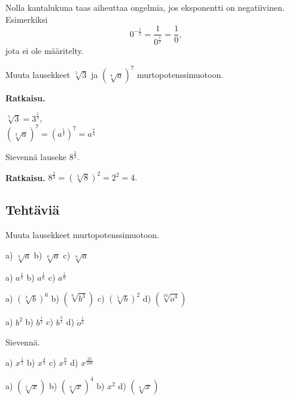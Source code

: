 Nolla kantalukuna taas aiheuttaa ongelmia, jos eksponentti on negatiivinen. Esimerkiksi
\[
 0^{-\tfrac{1}{2}}=\frac{1}{0^\frac{1}{2}}=\frac{1}{0}, %
\]
jota ei ole määritelty.

\begin{esimerkki}
Muuta lausekkeet $\sqrt[5]{3}$ ja $(\sqrt[4]{a})^7$ murtopotenssimuotoon.

{\bf Ratkaisu.}

$\sqrt[5]{3} = 3^\frac{1}{5}$, \\
$(\sqrt[4]{a})^7 = (a^\frac{1}{4})^7=a^\frac{7}{4}$
\end{esimerkki}

\begin{esimerkki}
Sievennä lauseke $8^\frac{2}{3}$.

{\bf Ratkaisu.}
 $8^\frac{2}{3} = (\sqrt[3]{8})^2 = 2^2 = 4.$
\end{esimerkki}

\subsection*{Tehtäviä}

Muuta lausekkeet murtopotenssimuotoon.

\begin{tehtava}
a) $\sqrt[3]{a}$ \qquad
b) $\sqrt[6]{a}$ \qquad
c) $\sqrt[n]{a}$ 
\begin{vastaus}	
a) $a^\frac{1}{3}$ \qquad
b) $a^\frac{1}{6}$ \qquad
c) $a^\frac{1}{n}$ \qquad
\end{vastaus}
\end{tehtava}

\begin{tehtava}
a) $(\sqrt[3]{b})^6$ \qquad
b) $(\sqrt[6]{b^3})$ \qquad
c) $(\sqrt[5]{b})^2$ \qquad
d) $(\sqrt[16]{\ddot{o}^4})$
\begin{vastaus}	
a) $b^2$ \qquad
b) $b^\frac{1}{2}$ \qquad
c) $b^\frac{2}{5}$ \qquad
d) $\ddot{o}^\frac{1}{4}$
\end{vastaus}
\end{tehtava}

Sievennä.
\begin{tehtava}
a) $x^\frac{1}{5}$ \qquad
b) $x^\frac{4}{3}$ \qquad
c) $x^\frac{8}{4}$ \qquad
d) $x^\frac{25}{100}$ \qquad
\begin{vastaus}	
a) $(\sqrt[5]{x})$ \qquad
b) $(\sqrt[3]{x})^4$ \qquad
b) $x^2$ \qquad
d) $(\sqrt[4]{x})$ 
\end{vastaus}
\end{tehtava}

